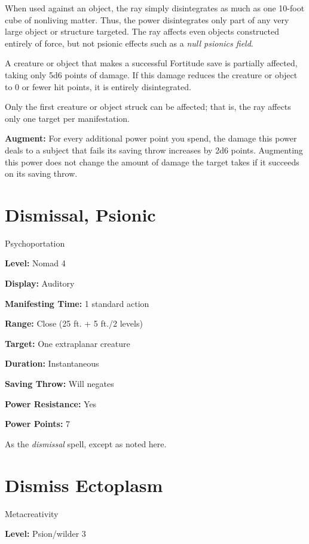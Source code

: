 \documentclass{article}
\begin{document}
When used against an object, the ray simply disintegrates as much as one 10-foot 
cube of nonliving matter. Thus, the power disintegrates only part of any very large 
object or structure targeted. The ray affects even objects constructed entirely 
of force, but not psionic effects such as a \textit{null psionics field}.

A creature or object that makes a successful Fortitude save is partially affected, 
taking only 5d6 points of damage. If this damage reduces the creature or object 
to 0 or fewer hit points, it is entirely disintegrated. 

Only the first creature or object struck can be affected; that is, the ray affects 
only one target per manifestation.

\textbf{Augment:} For every additional power point you spend, the damage this power 
deals to a subject that fails its saving throw increases by 2d6 points. Augmenting 
this power does not change the amount of damage the target takes if it succeeds 
on its saving throw. 

\vspace{12pt}
\section*{Dismissal, Psionic}

Psychoportation

\textbf{Level:} Nomad 4

\textbf{Display:} Auditory

\textbf{Manifesting Time:} 1 standard action

\textbf{Range:} Close (25 ft. + 5 ft./2 levels)

\textbf{Target:} One extraplanar creature

\textbf{Duration:} Instantaneous

\textbf{Saving Throw:} Will negates

\textbf{Power Resistance:} Yes

\textbf{Power Points:} 7

As the \textit{dismissal }spell, except as noted here.

\vspace{12pt}
\section*{Dismiss Ectoplasm}

Metacreativity

\textbf{Level:} Psion/wilder 3
\end{document}
